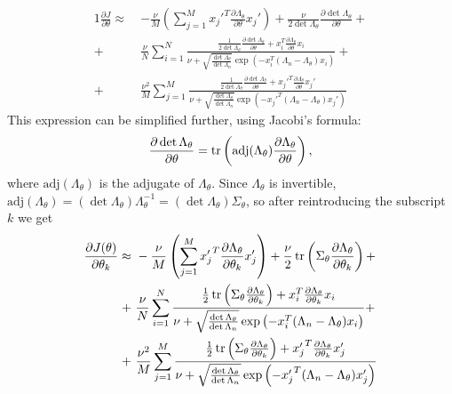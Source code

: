 \documentclass[a4paper]{article}
\begin{document}
\begin{alignat*}{1}
\frac{\partial J}{\partial \theta} \approx \ &-\frac{\nu}{M} \left( \sum_{j=1}^M {x_j'}^T \frac{\partial \Lambda_\theta}{\partial \theta} x_j'\right) + \frac{ \nu}{2 \det \Lambda_\theta} \frac{\partial \det \Lambda_\theta}{\partial \theta} +\\
+ \ &\frac{\nu}{N} \sum_{i=1}^N \frac{  \frac{1}{2 \det \Lambda_\theta} \frac{\partial \det \Lambda_\theta}{\partial \theta} + x_i^T \frac{\partial \Lambda_\theta}{\partial \theta} x_i}{\nu +  \sqrt{\frac{\det \Lambda_\theta}{\det \Lambda_n}} \exp\left(-x_i^T (\Lambda_n - \Lambda_\theta)x_i\right) } +\\
+ \ &\frac{\nu^2}{M} \sum_{j=1}^M \frac{ \frac{1}{2 \det \Lambda_\theta} \frac{\partial \det \Lambda_\theta}{\partial \theta} +   {x_j'}^T \frac{\partial \Lambda_\theta}{\partial \theta} {x_j'}}{\nu +  \sqrt{\frac{\det \Lambda_\theta}{\det \Lambda_n}} \exp\left(-{x_j'}^T (\Lambda_n - \Lambda_\theta){x_j'}\right)}
\end{alignat*}
This expression can be simplified further, using Jacobi's formula:
$$\frac{\partial \det \Lambda_\theta}{\partial \theta} = \tr\left( \text{adj}(\Lambda_\theta) \frac{\partial \Lambda_\theta}{\partial \theta} \right),$$
where $\text{adj}(\Lambda_\theta)$ is the adjugate of $\Lambda_\theta$. Since $\Lambda_\theta$ is invertible, $\text{adj}(\Lambda_\theta) = (\det \Lambda_\theta) \Lambda_\theta^{-1} = (\det \Lambda_\theta) \Sigma_\theta$, so after reintroducing the subscript $k$ we get
$$\begin{aligned}
\frac{\partial J(\theta)}{\partial \theta_k} \approx \ &-\frac{\nu}{M} \left( \sum_{j=1}^M {x_j'}^T \frac{\partial \Lambda_\theta}{\partial \theta_k} x_j'\right) + \frac{ \nu}{2} \tr\left( \Sigma_\theta \frac{\partial \Lambda_\theta}{\partial\theta_k}\right) +\\
+ \ &\frac{\nu}{N} \sum_{i=1}^N \frac{  \frac{1}{2}\tr\left( \Sigma_\theta \frac{\partial \Lambda_\theta}{\partial\theta_k}\right) + x_i^T \frac{\partial \Lambda_\theta}{\partial \theta_k} x_i}{\nu +  \sqrt{\frac{\det \Lambda_\theta}{\det \Lambda_n}} \exp\left(-x_i^T (\Lambda_n - \Lambda_\theta)x_i\right) } +\\
+ \ &\frac{\nu^2}{M} \sum_{j=1}^M \frac{ \frac{1}{2}\tr\left( \Sigma_\theta \frac{\partial \Lambda_\theta}{\partial\theta_k}\right) +   {x_j'}^T \frac{\partial \Lambda_\theta}{\partial \theta_k} {x_j'}}{\nu +  \sqrt{\frac{\det \Lambda_\theta}{\det \Lambda_n}} \exp\left(-{x_j'}^T (\Lambda_n - \Lambda_\theta){x_j'}\right)}
\end{aligned}$$
\end{document}
